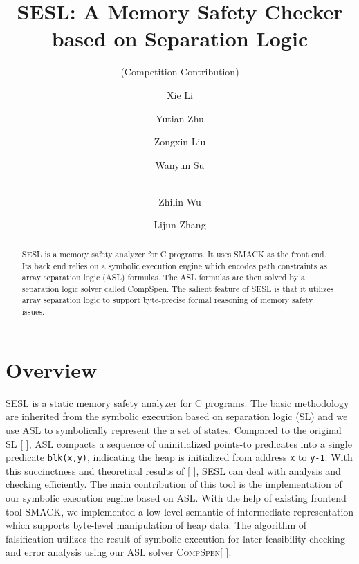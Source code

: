 \documentclass[runningheads]{llncs}
\newcommand{\lx}[1]{\color{teal}{LX: #1 :XL} \color{black}}
\begin{document}
%
\title{\textsc{SESL}: A Memory Safety Checker based on Separation Logic }
\subtitle{(Competition Contribution)}
%
%
\author{Xie Li \and
Yutian Zhu \and
Zongxin Liu \and
Wanyun Su\and
\\
Zhilin Wu\and
Lijun Zhang}
%
%


%
\maketitle              %
%
\begin{abstract}

SESL is a memory safety analyzer for C programs. It uses SMACK as the front end. Its back end relies on a symbolic execution engine which encodes path constraints as array separation logic (ASL) formulas. The ASL formulas are then solved by a separation logic solver called CompSpen. The salient feature of SESL is that it utilizes array separation logic to support byte-precise formal reasoning of memory safety issues.

\end{abstract}
%
%
%
\section{Overview}
\textsc{SESL} is a static memory safety analyzer for C programs. 
The basic methodology are inherited from the symbolic execution based on separation logic (SL)\cite{DBLP:conf/aplas/BerdineCO05} and we use ASL to symbolically represent the a set of states. 
Compared to the original SL \cite{DBLP:conf/lics/Reynolds02} [\lx{add later variants}], ASL compacts a sequence of uninitialized points-to predicates into a single predicate \texttt{blk(x,y)}, indicating the heap is initialized from address \texttt{x} to \texttt{y-1}. With this succinctness and theoretical results of [\lx{ASL solving paper}], \textsc{SESL} can deal with analysis and checking efficiently.
The main contribution of this tool is the implementation of our symbolic execution engine based on ASL.
With the help of existing frontend tool \textsc{SMACK}\cite{DBLP:conf/cav/RakamaricE14}, we implemented a low level semantic of intermediate representation which supports byte-level manipulation of heap data. The algorithm of falsification utilizes  the result of symbolic execution for later feasibility checking and error analysis using our ASL solver \textsc{CompSpen}[\lx{CompSpen paper or website}]. 
\end{document}
